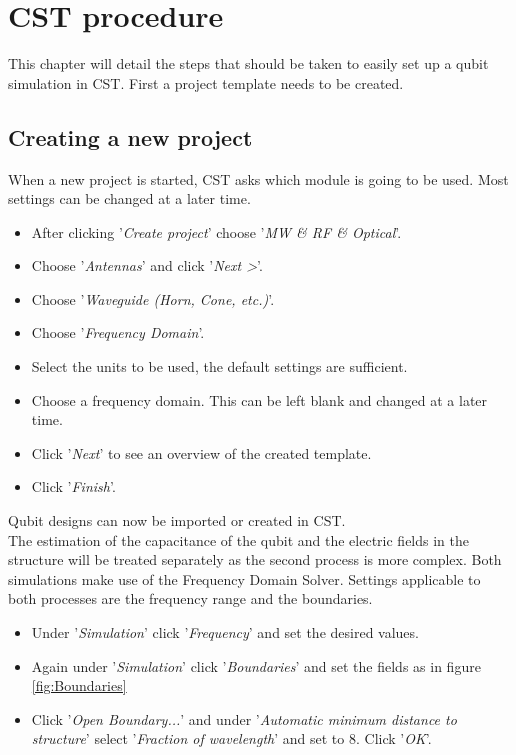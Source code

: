 \chapter{CST procedure}
This chapter will detail the steps that should be taken to easily set up a qubit simulation in CST. First a project template needs to be created.
\section{Creating a new project}
 When a new project is started, CST asks which module is going to be used. Most settings can be changed at a later time.
 \begin{itemize}
 	\item After clicking '\textit{Create project}' choose '\textit{MW \& RF \& Optical}'.
 	\item Choose '\textit{Antennas}' and click '\textit{Next >}'.
 	\item Choose '\textit{Waveguide (Horn, Cone, etc.)}'.
 	\item Choose '\textit{Frequency Domain}'.
 	\item Select the units to be used, the default settings are sufficient.
 	\item Choose a frequency domain. This can be left blank and changed at a later time.
 	\item Click '\textit{Next}' to see an overview of the created template.
 	\item Click '\textit{Finish}'. 
 \end{itemize}
Qubit designs can now be imported or created in CST.\\

The estimation of the capacitance of the qubit and the electric fields in the structure will be treated separately as the second process is more complex. Both simulations make use of the Frequency Domain Solver. Settings applicable to both processes are the frequency range and the boundaries. 
\begin{itemize}
	\item Under '\textit{Simulation}' click '\textit{Frequency}' and set the desired values.
	\item Again under '\textit{Simulation}' click '\textit{Boundaries}' and set the fields as in figure \ref{fig:Boundaries}
	\item Click '\textit{Open Boundary...}' and under '\textit{Automatic minimum distance to structure}' select '\textit{Fraction of wavelength}' and set to 8. Click '\textit{OK}'.
\end{itemize}

